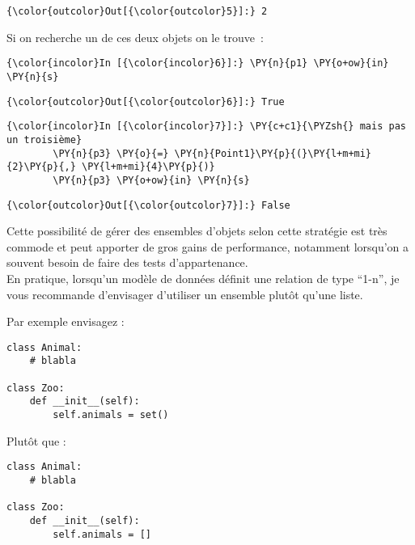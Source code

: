 \begin{Verbatim}[commandchars=\\\{\}]
{\color{outcolor}Out[{\color{outcolor}5}]:} 2
\end{Verbatim}
            
    Si on recherche un de ces deux objets on le trouve~:

    \begin{Verbatim}[commandchars=\\\{\}]
{\color{incolor}In [{\color{incolor}6}]:} \PY{n}{p1} \PY{o+ow}{in} \PY{n}{s}
\end{Verbatim}


\begin{Verbatim}[commandchars=\\\{\}]
{\color{outcolor}Out[{\color{outcolor}6}]:} True
\end{Verbatim}
            
    \begin{Verbatim}[commandchars=\\\{\}]
{\color{incolor}In [{\color{incolor}7}]:} \PY{c+c1}{\PYZsh{} mais pas un troisième}
        \PY{n}{p3} \PY{o}{=} \PY{n}{Point1}\PY{p}{(}\PY{l+m+mi}{2}\PY{p}{,} \PY{l+m+mi}{4}\PY{p}{)}
        \PY{n}{p3} \PY{o+ow}{in} \PY{n}{s}
\end{Verbatim}


\begin{Verbatim}[commandchars=\\\{\}]
{\color{outcolor}Out[{\color{outcolor}7}]:} False
\end{Verbatim}
            
    Cette possibilité de gérer des ensembles d'objets selon cette stratégie
est très commode et peut apporter de gros gains de performance,
notamment lorsqu'on a souvent besoin de faire des tests d'appartenance.\\

En pratique, lorsqu'un modèle de données définit une relation de type
``1-n'', je vous recommande d'envisager d'utiliser un ensemble plutôt
qu'une liste.

    Par exemple envisagez :

\begin{verbatim}
class Animal:
    # blabla
   
class Zoo:
    def __init__(self):
        self.animals = set()
\end{verbatim}

    Plutôt que :

\begin{verbatim}
class Animal:
    # blabla
   
class Zoo:
    def __init__(self):
        self.animals = []
\end{verbatim}

